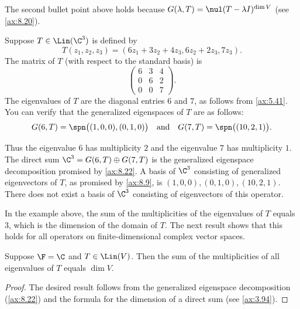 The second bullet point above holds because
$G(\lambda,T)=\nul(T-\lambda I)^{\dim V}$ (see \ref{ax:8.20}).

\begin{example}\label{ax:8.24}
Suppose $T\in\Lin(\C^3)$ is defined by
\[ T(z_1,z_2,z_3) = (6z_1+3z_2+4z_3,6z_2+2z_3,7z_3). \]
The matrix of $T$ (with respect to the standard basis) is
\[ \begin{pmatrix} 6 & 3 & 4\\ 0 & 6 & 2\\ 0 & 0 & 7 \end{pmatrix}. \]
The eigenvalues of $T$ are the diagonal entries $6$ and $7$, as follows from
\ref{ax:5.41}. You can verify that the generalized eigenspaces of $T$ are as
follows:
\[ G(6,T) = \spn\bigl((1,0,0),(0,1,0)\bigr) \quad\text{and}\quad
   G(7,T) = \spn\bigl((10,2,1)\bigr). \]

Thus the eigenvalue $6$ has multiplicity $2$ and the eigenvalue $7$ has
multiplicity $1$. The direct sum $\C^3=G(6,T)\oplus G(7,T)$ is the generalized
eigenspace decomposition promised by \ref{ax:8.22}. A basis of $\C^3$
consisting of generalized eigenvectors of $T$, as promised by \ref{ax:8.9}, is
$(1,0,0),(0,1,0),(10,2,1)$. There does not exist a basis of $\C^3$ consisting
of eigenvectors of this operator.
\end{example}

%
In the example above, the sum of the multiplicities of the eigenvalues of $T$
equals $3$, which is the dimension of the domain of $T$. The next result shows
that this holds for all operators on finite-dimensional complex vector spaces.

\begin{result}\label{ax:8.25}
Suppose $\F=\C$ and $T\in\Lin(V)$. Then the sum of the multiplicities of all
eigenvalues of $T$ equals $\dim V$.
\end{result}

\begin{proof}
The desired result follows from the generalized eigenspace decomposition
(\ref{ax:8.22}) and the formula for the dimension of a direct sum (see
\ref{ax:3.94}).
\end{proof}

